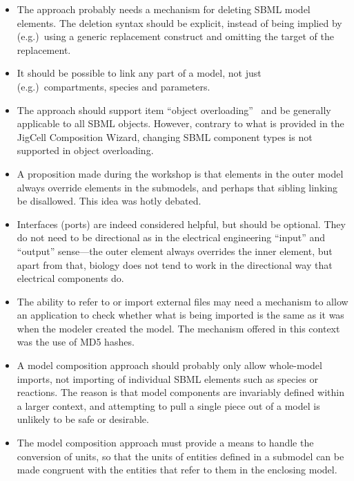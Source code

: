 \begin{enumerate}
\begin{itemize}
  \item The approach probably needs a mechanism for deleting SBML
    model elements.  The deletion syntax should be explicit, instead
    of being implied by (e.g.)\ using a generic replacement construct
    and omitting the target of the replacement.

  \item It should be possible to link any part of a model, not just
    (e.g.)\ compartments, species and parameters.

  \item The approach should support item ``object
    overloading''~\citep{various:2007b} and be generally applicable to
    all SBML objects.  However, contrary to what is provided in the
    JigCell Composition Wizard, changing SBML component types is not
    supported in object overloading.

  \item A proposition made during the workshop is that elements in the
    outer model always override elements in the submodels, and perhaps
    that sibling linking be disallowed.  This idea was hotly debated.

  \item Interfaces (ports) are indeed considered helpful, but should
    be optional.  They do not need to be directional as in the
    electrical engineering ``input'' and ``output'' sense---the outer
    element always overrides the inner element, but apart from that,
    biology does not tend to work in the directional way that
    electrical components do.

  \item The ability to refer to or import external files may need a
    mechanism to allow an application to check whether what is being
    imported is the same as it was when the modeler created the
    model.  The mechanism offered in this context was the use of MD5
    hashes.

  \item A model composition approach should probably only allow
    whole-model imports, not importing of individual SBML elements
    such as species or reactions.  The reason is that model components
    are invariably defined within a larger context, and attempting to
    pull a single piece out of a model is unlikely to be safe or
    desirable.

  \item The model composition approach must provide a means to handle
    the conversion of units, so that the units of entities defined in
    a submodel can be made congruent with the entities that refer to
    them in the enclosing model.

  \end{itemize}

\end{enumerate}

